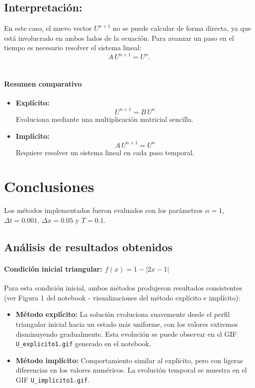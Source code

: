 \documentclass[12pt,a4paper]{article}
\begin{document}
\subsection*{Interpretación:} 
En este caso, el nuevo vector \(U^{n+1}\) no se puede calcular de forma directa, ya que está involucrado en ambos lados de la ecuación.  
Para avanzar un paso en el tiempo es necesario resolver el sistema lineal:
\[
A\,U^{n+1} = U^n.
\] \\

\paragraph{Resumen comparativo}

\begin{itemize}
    \item \textbf{Explícito:}  
    \[
    U^{n+1} = B\,U^n
    \]
    Evoluciona mediante una multiplicación matricial sencilla.
    
    \item \textbf{Implícito:}  
    \[
    A\,U^{n+1} = U^n
    \]
    Requiere resolver un sistema lineal en cada paso temporal.
\end{itemize}

\section{Conclusiones}

Los métodos implementados fueron evaluados con los parámetros $\alpha = 1$, $\Delta t = 0.001$, $\Delta x = 0.05$ y $T = 0.1$.

\subsection{Análisis de resultados obtenidos}

\paragraph{Condición inicial triangular: $f(x) = 1 - |2x - 1|$}

Para esta condición inicial, ambos métodos produjeron resultados consistentes (ver Figura 1 del notebook - visualizaciones del método explícito e implícito):

\begin{itemize}
    \item \textbf{Método explícito:} La solución evoluciona suavemente desde el perfil triangular inicial hacia un estado más uniforme, con los valores extremos disminuyendo gradualmente. Esta evolución se puede observar en el GIF \texttt{U\_explicito1.gif} generado en el notebook.
    \item \textbf{Método implícito:} Comportamiento similar al explícito, pero con ligeras diferencias en los valores numéricos. La evolución temporal se muestra en el GIF \texttt{U\_implicito1.gif}.
\end{itemize}
\end{document}

